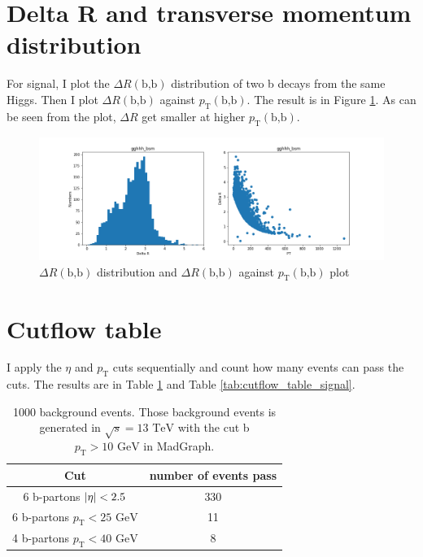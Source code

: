 \documentclass[12pt]{article}
\begin{document}
\section{Delta R and transverse momentum distribution}%
\label{sec:delta_r_and_transverse_momentum_distribution}
	For signal, I plot the $\Delta R(\text{b,b})$ distribution of two b decays from the same Higgs. Then I plot $\Delta R(\text{b,b})$ against $p_\text{T}(\text{b,b})$. The result is in Figure \ref{fig:dR(b,b)_and_pT(b,b)}. As can be seen from the plot, $\Delta R$ get smaller at higher $p_\text{T}(\text{b,b})$. 
	\begin{figure}[htpb]
		\centering
		\includegraphics[width=1\textwidth]{gghhh_bsm_bb_Delta_R.png}
		\caption{$\Delta R(\text{b,b})$ distribution and $\Delta R(\text{b,b})$ against $p_\text{T}(\text{b,b})$ plot}
		\label{fig:dR(b,b)_and_pT(b,b)}
	\end{figure}
\section{Cutflow table}%
\label{sec:cutflow_table}
I apply the $\eta$ and $p_\text{T}$ cuts sequentially and count how many events can pass the cuts. The results are in Table \ref{tab:cutflow_table_background} and Table \ref{tab:cutflow_table_signal}.
	\begin{table}[htpb]
		\centering
		\caption{1000 background events. Those background events is generated in $\sqrt{s} = 13 \text{ TeV}$ with the cut b $p_\text{T} > 10 \text{ GeV}$ in MadGraph.
}
		\label{tab:cutflow_table_background}
		\begin{tabular}{cc}
			Cut & number of events pass \\
			\hline
			6 b-partons $\abs{\eta}<2.5$ & 330 \\
			6 b-partons $p_\text{T} < 25 \text{ GeV}$ & 11 \\
			4 b-partons $p_\text{T} < 40 \text{ GeV}$ & 8                            
		\end{tabular}	
	\end{table}
	
\end{document}

